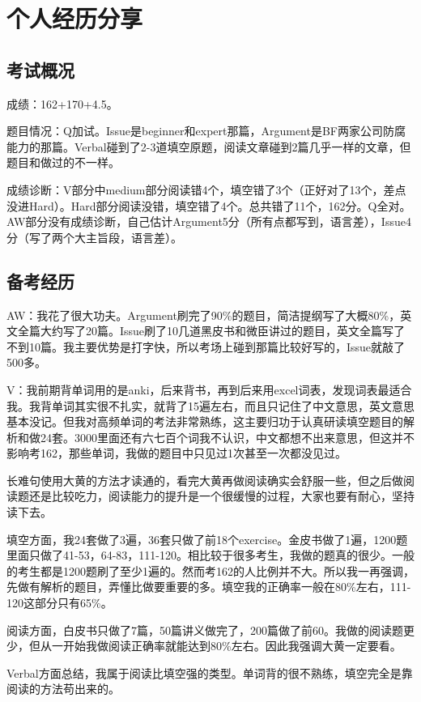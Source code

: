 \documentclass[cn,plain]{./src/qyxfbook}
\newcommand{\red}[1]{\textcolor[rgb]{1,0,0}{#1}}
\begin{document}
	
	

	\chapter{个人经历分享}
		
		\section{考试概况}
			成绩：162+170+4.5。\par
			题目情况：Q加试。Issue是beginner和expert那篇，Argument是BF两家公司防腐能力的那篇。Verbal碰到了2-3道填空原题，阅读文章碰到2篇几乎一样的文章，但题目和做过的不一样。\par
			成绩诊断：V部分中medium部分阅读错4个，填空错了3个（正好对了13个，差点没进Hard）。Hard部分阅读没错，填空错了4个。总共错了11个，162分。Q全对。AW部分没有成绩诊断，自己估计Argument5分（所有点都写到，语言差），Issue4分（写了两个大主旨段，语言差）。
		
			
		\section{备考经历}
			AW：我花了很大功夫。Argument刷完了90\%的题目，简洁提纲写了大概80\%，英文全篇大约写了20篇。Issue刷了10几道黑皮书和微臣讲过的题目，英文全篇写了不到10篇。我主要优势是打字快，所以考场上碰到那篇比较好写的，Issue就敲了500多。

			
			V：我前期背单词用的是anki，后来背书，再到后来用excel词表，发现词表最适合我。我背单词其实很不扎实，就背了15遍左右，而且只记住了中文意思，英文意思基本没记。但我对高频单词的考法非常熟练，这主要归功于\red{\Large 认真研读填空题目的解析和做24套。}3000里面还有六七百个词我不认识，中文都想不出来意思，但这并不影响考162，那些单词，我做的题目中只见过1次甚至一次都没见过。\par
			长难句使用大黄的方法才读通的，看完大黄再做阅读确实会舒服一些，但之后做阅读题还是比较吃力，阅读能力的提升是一个很缓慢的过程，大家也要有耐心，坚持读下去。\par
			填空方面，我24套做了3遍，36套只做了前18个exercise。金皮书做了1遍，1200题里面只做了41-53，64-83，111-120。相比较于很多考生，我做的题真的很少。一般的考生都是1200题刷了至少1遍的。然而考162的人比例并不大。所以我一再强调，先做有解析的题目，弄懂比做要重要的多。填空我的正确率一般在80\%左右，111-120这部分只有65\%。\par
			阅读方面，白皮书只做了7篇，50篇讲义做完了，200篇做了前60。我做的阅读题更少，但从一开始我做阅读正确率就能达到80\%左右。因此我强调大黄一定要看。\par
			Verbal方面总结，我属于阅读比填空强的类型。单词背的很不熟练，填空完全是靠阅读的方法苟出来的。
\end{document}
